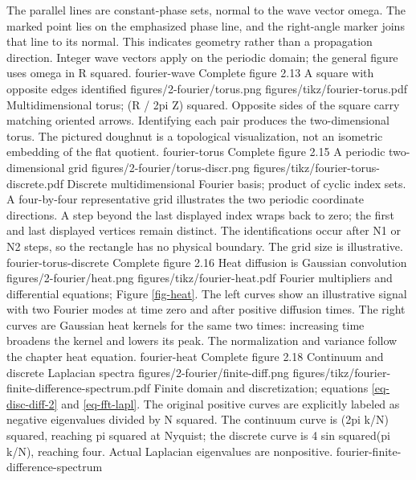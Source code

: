 {The parallel lines are constant-phase sets, normal to the wave vector omega. The marked point lies on the emphasized phase line, and the right-angle marker joins that line to its normal. This indicates geometry rather than a propagation direction. Integer wave vectors apply on the periodic domain; the general figure uses omega in R squared.}
{fourier-wave}
{Complete figure}
{2.13}
{A square with opposite edges identified}
{figures/2-fourier/torus.png}
{figures/tikz/fourier-torus.pdf}
{Multidimensional torus; (R / 2pi Z) squared.}
{Opposite sides of the square carry matching oriented arrows. Identifying each pair produces the two-dimensional torus. The pictured doughnut is a topological visualization, not an isometric embedding of the flat quotient.}
{fourier-torus}
{Complete figure}
{2.15}
{A periodic two-dimensional grid}
{figures/2-fourier/torus-discr.png}
{figures/tikz/fourier-torus-discrete.pdf}
{Discrete multidimensional Fourier basis; product of cyclic index sets.}
{A four-by-four representative grid illustrates the two periodic coordinate directions. A step beyond the last displayed index wraps back to zero; the first and last displayed vertices remain distinct. The identifications occur after N1 or N2 steps, so the rectangle has no physical boundary. The grid size is illustrative.}
{fourier-torus-discrete}
{Complete figure}
{2.16}
{Heat diffusion is Gaussian convolution}
{figures/2-fourier/heat.png}
{figures/tikz/fourier-heat.pdf}
{Fourier multipliers and differential equations; Figure \ref{fig-heat}.}
{The left curves show an illustrative signal with two Fourier modes at time zero and after positive diffusion times. The right curves are Gaussian heat kernels for the same two times: increasing time broadens the kernel and lowers its peak. The normalization and variance follow the chapter heat equation.}
{fourier-heat}
{Complete figure}
{2.18}
{Continuum and discrete Laplacian spectra}
{figures/2-fourier/finite-diff.png}
{figures/tikz/fourier-finite-difference-spectrum.pdf}
{Finite domain and discretization; equations \eqref{eq-disc-diff-2} and \eqref{eq-fft-lapl}.}
{The original positive curves are explicitly labeled as negative eigenvalues divided by N squared. The continuum curve is (2pi k/N) squared, reaching pi squared at Nyquist; the discrete curve is 4 sin squared(pi k/N), reaching four. Actual Laplacian eigenvalues are nonpositive.}
{fourier-finite-difference-spectrum}
